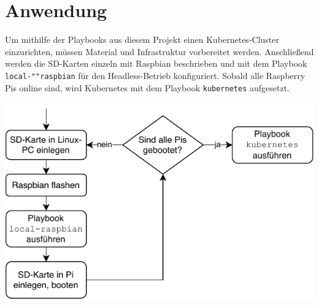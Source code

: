 \chapter{Anwendung}

Um mithilfe der Playbooks aus diesem Projekt einen Kubernetes-Cluster einzurichten, müssen Material und Infrastruktur vorbereitet werden.
Anschließend werden die SD-Karten einzeln mit Raspbian beschrieben und mit dem Playbook \texttt{local-""raspbian} für den Headless-Betrieb konfiguriert.
Sobald alle Raspberry Pis online sind, wird Kubernetes mit dem Playbook \texttt{kubernetes} aufgesetzt.

\includegraphics[width=\textwidth]{img/anwendung.pdf}

